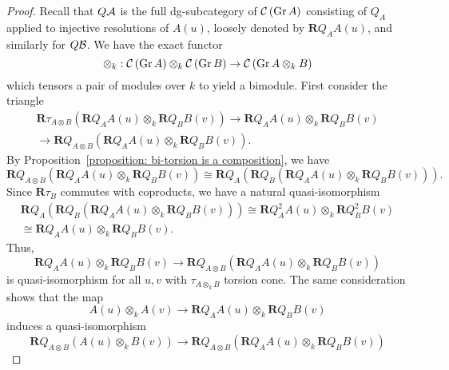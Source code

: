 \documentclass[dissertation.tex]{subfiles}
\begin{document}
\begin{proof}
  Recall that \(Q \mathcal{A}\) is the full dg-subcategory of \(\mathcal{C}\left(\operatorname{Gr}A\right)\) consisting of \(Q_{A}\) applied to injective resolutions of \(A(u)\), loosely denoted by \(\mathbf{R}Q_A A(u)\), and similarly for \(Q \mathcal{B}\). We have the exact functor
  \begin{displaymath}
    \otimes_k : \mathcal{C}\left(\operatorname{Gr}A\right) \otimes_k \mathcal{C}\left(\operatorname{Gr}B\right) \to \mathcal{C}\left(\operatorname{Gr}A \otimes_k B\right)
  \end{displaymath}
  which tensors a pair of modules over \(k\) to yield a bimodule. First consider the triangle
  \begin{gather*}
    \mathbf{R}\tau_{A \otimes B} (\mathbf{R} Q_A A(u) \otimes_k \mathbf{R} Q_B B(v) ) \to \mathbf{R} Q_A A(u) \otimes_k \mathbf{R} Q_B B(v) \\ \to \mathbf{R}Q_{A \otimes B} (\mathbf{R} Q_A A(u) \otimes_k \mathbf{R} Q_B B(v) ).
  \end{gather*}
  By Proposition~\ref{proposition: bi-torsion is a composition}, we have 
  \begin{displaymath}
    \mathbf{R}Q_{A \otimes B} (\mathbf{R} Q_A A(u) \otimes_k \mathbf{R} Q_B B(v) ) \cong \mathbf{R} Q_A \left( \mathbf{R}Q_B \left( \mathbf{R} Q_A A(u) \otimes_k \mathbf{R} Q_B B(v) \right) \right).
  \end{displaymath}
  Since \(\mathbf{R}\tau_B\) commutes with coproducts, we have a natural quasi-isomorphism
  \begin{gather*}
    \mathbf{R} Q_A \left( \mathbf{R}Q_B \left( \mathbf{R} Q_A A(u) \otimes_k \mathbf{R} Q_B B(v) \right) \right) \cong \mathbf{R}Q_A^2 A(u) \otimes_k \mathbf{R}Q_B^2 B(v) \\ \cong \mathbf{R}Q_A A(u) \otimes_k \mathbf{R}Q_B B(v). 
  \end{gather*}
  Thus, 
  \begin{displaymath}
    \mathbf{R} Q_A A(u) \otimes_k \mathbf{R} Q_B B(v) \to \mathbf{R}Q_{A \otimes B} (\mathbf{R} Q_A A(u) \otimes_k \mathbf{R} Q_B B(v) )
  \end{displaymath}
  is quasi-isomorphism for all \(u,v\) with \(\tau_{A \otimes_k B}\) torsion cone. The same consideration shows that the map 
  \begin{displaymath}
    A(u) \otimes_k A(v) \to \mathbf{R} Q_A A(u) \otimes_k \mathbf{R} Q_B B(v)
  \end{displaymath}
  induces a quasi-isomorphism
  \begin{displaymath}
    \mathbf{R}Q_{A \otimes B}( A(u) \otimes_k B(v) ) \to \mathbf{R}Q_{A \otimes B} (\mathbf{R} Q_A A(u) \otimes_k \mathbf{R} Q_B B(v) )

\end{displaymath}
\end{proof}
\end{document}
